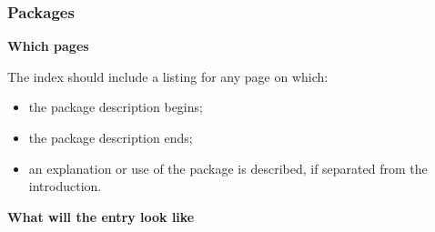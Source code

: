 \documentclass{article}
\begin{document}
\subsubsection{Packages}%
%
\label{packages}

\begin{description}
   \item{\bf Which pages}

         The index should include a listing for any page on which:
           \begin{itemize}
              \item the package description begins;
              \item the package description ends;
              \item an explanation or use of the package
                    is described, if separated from the introduction.
           \end{itemize}
   \item{\bf What will the entry look like}


\end{description}
\end{document}
